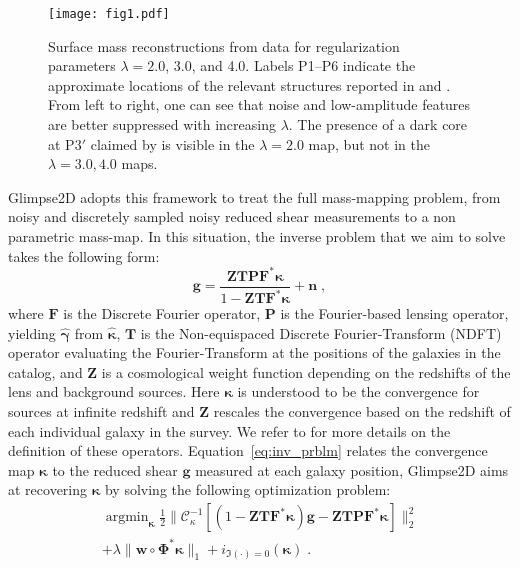 \documentclass[iop,twocolappendix]{emulateapj}
\newcommand{\cta}[1]{\citetalias{#1}}
\DeclareMathOperator*{\argmin}{argmin}
\begin{document}
\begin{figure*}
\centering
\texttt{[image: fig1.pdf]}
\caption{Surface mass reconstructions from \cta{C12} data for regularization parameters $\lambda=2.0$, 
         3.0, and 4.0. Labels P1--P6 indicate the approximate locations of the relevant structures reported in
         \cta{C12} and \cta{J14}. From left to right, one can see that noise and low-amplitude features are 
         better suppressed with increasing $\lambda$. The presence of a dark core at P$3'$ claimed by 
         \cta{J14} is visible in the $\lambda=2.0$ map, but not in the $\lambda=3.0, 4.0$ maps.}
\label{fig:fig1}
\end{figure*}

Glimpse2D adopts this framework to treat the full mass-mapping problem, from noisy and discretely 
sampled noisy reduced shear measurements to a non parametric mass-map. In this situation, the 
inverse problem that we aim to solve takes the following form:
\begin{equation}
	\bm{g} = \frac{\bm{Z} \mathbf{T} \mathbf{P} \mathbf{F}^* \bm{\kappa}}{1 - \bm{Z} \mathbf{T} \mathbf{F}^* \bm{\kappa} } + \bm{n} \;,
	\label{eq:inv_prblm}
\end{equation}
where $\mathbf{F}$ is the Discrete Fourier operator, $\mathbf{P}$ is the Fourier-based lensing 
operator, yielding $\hat{\bm{\gamma}}$ from $\hat{\bm{\kappa}}$, $\mathbf{T}$ is the 
Non-equispaced Discrete Fourier-Transform (NDFT) operator evaluating the Fourier-Transform at 
the positions of the galaxies in the catalog, and $\mathbf{Z}$ is a cosmological weight 
function depending on the redshifts of the lens and background sources. Here $\bm{\kappa}$ is 
understood to be the convergence for sources at infinite redshift and $\mathbf{Z}$ rescales 
the convergence based on the redshift of each individual galaxy in the survey. We refer to 
\cite{LSL.etal.2016} for more details on the definition of these operators. 
Equation~\eqref{eq:inv_prblm} relates the convergence map $\bm{\kappa}$  to the reduced shear 
$\bm{g}$ measured at each galaxy position, Glimpse2D aims at recovering $\bm{\kappa}$ by 
solving the following optimization problem:
\begin{multline}
 \argmin_{\bm{\kappa}} \frac{1}{2} \parallel \mathcal{C}_\kappa^{-1} \left[ (1 - \bm{Z} \mathbf{T} \mathbf{F}^* \bm{\kappa}) \bm{g} - \bm{Z}\mathbf{T} \mathbf{P} \mathbf{F}^* \bm{\kappa} \right] \parallel_2^2 \\ + \lambda \parallel \bm{w} \circ \bm{\Phi}^* \bm{\kappa} \parallel_1 + i_{\Im(\cdot) = 0}(\bm{\kappa}) \;.
 \label{eq:algo_rec_non_lin_linearised_z}
\end{multline}
\end{document}
